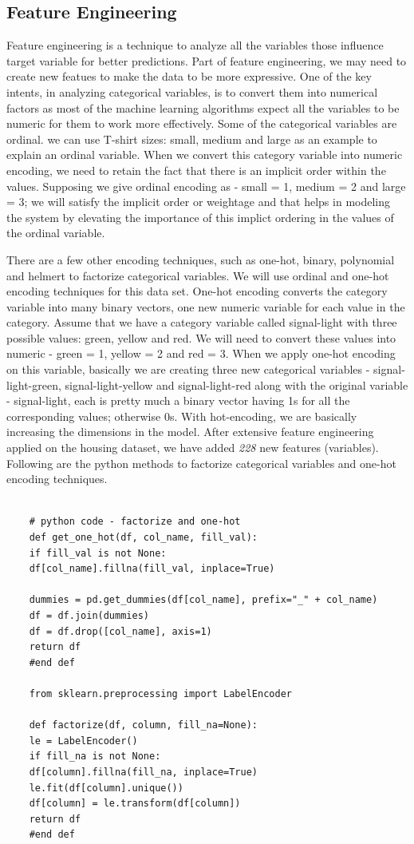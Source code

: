 \documentclass[sigconf]{acmart}
\begin{document}
	\subsection{Feature Engineering}
	
	Feature engineering is a technique to analyze all the variables those influence target variable for better predictions. Part of feature engineering, we may need to create new featues to make the data to be more expressive. One of the key intents, in analyzing categorical variables, is to convert them into numerical factors as most of the machine learning algorithms expect all the variables to be numeric for them to work more effectively. Some of the categorical variables are ordinal. we can use T-shirt sizes: small, medium and large as an example to explain an ordinal variable. When we convert this category variable into numeric encoding, we need to retain the fact that there is an implicit order within the values. Supposing we give ordinal encoding as - small = 1, medium = 2 and large = 3; we will satisfy the implicit order or weightage and that helps in modeling the system by elevating the importance of this implict ordering in the values of the ordinal variable.
	
	There are a few other encoding techniques, such as one-hot, binary, polynomial and helmert to factorize categorical variables. We will use ordinal and one-hot encoding techniques for this data set. One-hot encoding converts the category variable into many binary vectors, one new numeric variable for each value in the category. Assume that we have a category variable called signal-light with three possible values: green, yellow and red. We will need to convert these values into numeric - green = 1, yellow = 2 and red = 3. When we apply one-hot encoding on this variable, basically we are creating three new categorical variables - signal-light-green, signal-light-yellow and signal-light-red along with the original variable - signal-light, each is pretty much a binary vector having 1s for all the corresponding values; otherwise 0s. With hot-encoding, we are basically increasing the dimensions in the model. After extensive feature engineering applied on the housing dataset, we have added {\em 228} new features (variables). Following are the python methods to factorize categorical variables and one-hot encoding techniques. 
	
	\begin{verbatim}
	
	# python code - factorize and one-hot
	def get_one_hot(df, col_name, fill_val):
	if fill_val is not None:
	df[col_name].fillna(fill_val, inplace=True)
	
	dummies = pd.get_dummies(df[col_name], prefix="_" + col_name)
	df = df.join(dummies)
	df = df.drop([col_name], axis=1)
	return df
	#end def
	
	from sklearn.preprocessing import LabelEncoder
	
	def factorize(df, column, fill_na=None):
	le = LabelEncoder()
	if fill_na is not None:
	df[column].fillna(fill_na, inplace=True)
	le.fit(df[column].unique())
	df[column] = le.transform(df[column])
	return df
	#end def
	\end{verbatim}
	
\end{document}
